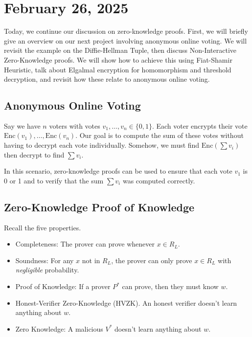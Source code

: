 \section{February 26, 2025}
\label{20250226}

Today, we continue our discussion on zero-knowledge proofs. First, we will briefly give an overview on our next project involving anonymous online voting. We will revisit the example on the Diffie-Hellman Tuple, then discuss Non-Interactive Zero-Knowledge proofs. We will show how to achieve this using Fiat-Shamir Heuristic, talk about Elgalmal encryption for homomorphism and threshold decryption, and revisit how these relate to anonymous online voting.

\subsection{Anonymous Online Voting}

Say we have $n$ voters with votes $v_1, \dots, v_n \in \{ 0, 1\}$. Each voter encrypts their vote $\text{Enc}(v_1), \dots, \text{Enc}(v_n)$. Our goal is to compute the sum of these votes without having to decrypt each vote individually. Somehow, we must find $\text{Enc}(\sum v_i)$ then decrypt to find $\sum v_i$.

In this scenario, zero-knowledge proofs can be used to ensure that each vote $v_1$ is 0 or 1 and to verify that the sum $\sum v_i$ was computed correctly.

\subsection{Zero-Knowledge Proof of Knowledge}

Recall the five properties.

\begin{itemize}
    \item Completeness: The prover can prove whenever $x\in R_L$.
    \item Soundness: For any $x$ not in $R_L$, the prover can only prove $x\in R_L$ with \emph{negligible} probability.
    \item Proof of Knowledge: If a prover $P^*$ can prove, then they must know $w$.
    \item Honest-Verifier Zero-Knowledge (HVZK). An honest verifier doesn't learn anything about $w$.
    \item Zero Knowledge: A malicious $V^*$ doesn't learn anything about $w$.
\end{itemize}


